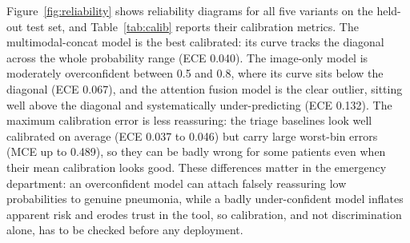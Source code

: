 \documentclass[twocolumn, final]{svjour3}
\begin{document}
Figure~\ref{fig:reliability} shows reliability diagrams for all five variants on the
held-out test set, and Table~\ref{tab:calib} reports their calibration metrics. The
multimodal-concat model is the best calibrated: its curve tracks the diagonal across the
whole probability range (ECE 0.040). The image-only model is moderately overconfident
between 0.5 and 0.8, where its curve sits below the diagonal (ECE 0.067), and the
attention fusion model is the clear outlier, sitting well above the diagonal and
systematically under-predicting (ECE 0.132). The maximum calibration error is less
reassuring: the triage baselines look well calibrated on average (ECE 0.037 to 0.046) but
carry large worst-bin errors (MCE up to 0.489), so they can be badly wrong for some
patients even when their mean calibration looks good. These differences matter in
the emergency department: an overconfident model can attach falsely reassuring low
probabilities to genuine pneumonia, while a badly under-confident model inflates apparent
risk and erodes trust in the tool, so calibration, and not discrimination alone, has to
be checked before any deployment.
\end{document}
